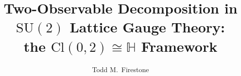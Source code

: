 \documentclass[12pt]{article}
\numberwithin{equation}{section}
\theoremstyle{plain}
\theoremstyle{definition}
\theoremstyle{remark}
\newcommand{\cl}{\mathrm{Cl}}              %
\newcommand{\su}{\mathrm{SU}}              %
\newcommand{\HH}{\mathbb{H}}               %
\begin{document}
	
	\title{%
		\textbf{Two-Observable Decomposition in
			\texorpdfstring{$\su(2)$}{SU(2)} Lattice Gauge Theory:}\\[4pt]
		\textbf{the \texorpdfstring{$\cl(0,2)\cong\HH$}{Cl(0,2) = H}
			Framework}%
	}
	
	\author{Todd M.\ Firestone\\[2pt]
		\textit{\small }}
	
	\date{}
	
	\maketitle
	\thispagestyle{fancy}
	
\end{document}
